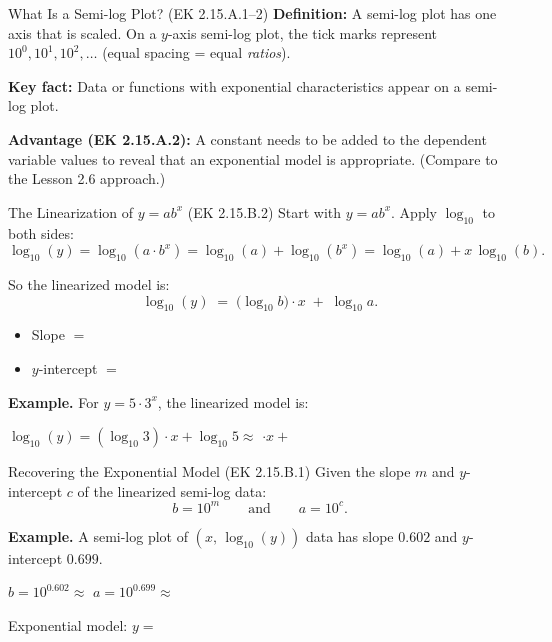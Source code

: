 \documentclass[10pt]{article}
\begin{document}
\vspace{0.08in}

\begin{notesbox}{What Is a Semi-log Plot? (EK 2.15.A.1--2)}
\textbf{Definition:} A semi-log plot has one axis that is  scaled.
On a $y$-axis semi-log plot, the tick marks represent $10^0, 10^1, 10^2, \ldots$ (equal
spacing = equal \emph{ratios}).

\vspace{6pt}
\textbf{Key fact:} Data or functions with exponential characteristics appear
 on a semi-log plot.

\vspace{6pt}
\textbf{Advantage (EK 2.15.A.2):} A constant  needs to be added to
the dependent variable values to reveal that an exponential model is appropriate.
(Compare to the Lesson 2.6 approach.)
\end{notesbox}

\vspace{0.08in}

\begin{notesbox}{The Linearization of $y = ab^x$ (EK 2.15.B.2)}
Start with $y = ab^x$.  Apply $\log_{10}$ to both sides:
\[
  \log_{10}(y) = \log_{10}(a \cdot b^x) = \log_{10}(a) + \log_{10}(b^x) = \log_{10}(a) + x\,\log_{10}(b).
\]

So the linearized model is:
\[
  \log_{10}(y) \;=\; \bigl(\log_{10} b\bigr)\cdot x \;+\; \log_{10} a.
\]
\begin{itemize}[leftmargin=1.5em,itemsep=4pt,topsep=4pt]
  \item Slope $=$ 
  \item $y$-intercept $=$ 
\end{itemize}

\vspace{6pt}
\textbf{Example.} For $y = 5 \cdot 3^x$, the linearized model is:

\vspace{4pt}
$\log_{10}(y) = (\log_{10} 3)\cdot x + \log_{10} 5 \approx $ $\cdot x + $ 
\end{notesbox}

\vspace{0.08in}

\begin{notesbox}{Recovering the Exponential Model (EK 2.15.B.1)}
Given the slope $m$ and $y$-intercept $c$ of the linearized semi-log data:
\[
  b = 10^m \qquad \text{and} \qquad a = 10^c.
\]

\textbf{Example.}  A semi-log plot of $(x,\,\log_{10}(y))$ data has slope $0.602$ and
$y$-intercept $0.699$.

\vspace{4pt}
$b = 10^{0.602} \approx $  \qquad $a = 10^{0.699} \approx $ 

\vspace{4pt}
Exponential model: $y = $ 
\end{notesbox}
\end{document}
